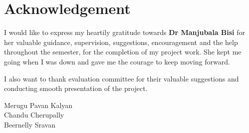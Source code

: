 \chapter*{Acknowledgement}
I would like to express my heartily gratitude towards  \textbf{Dr Manjubala Bisi} for her valuable guidance, supervision,
suggestions, encouragement and the help throughout the semester, for the completion of my project work. She kept me going when I was down and gave me the courage to keep moving forward.

I also want to thank evaluation committee for their valuable suggestions and conducting smooth presentation of the project.

\vspace{10em}
\begin {flushleft}


Merugu Pavan Kalyan \\[1 cm]
Chandu Cherupally \\[1 cm]
Beernelly Sravan \\[1 cm]
\end{flushleft}